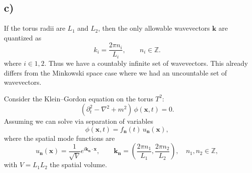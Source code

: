 \documentclass[12pt]{article}
\begin{document}
\subsection*{c)}
If the torus radii are $L_1$ and $L_2$, then the only allowable wavevectors 
$\mathbf{k}$ are quantized as
\begin{equation}
   k_i = \frac{2\pi n_i}{L_i}, \qquad n_i \in \mathbb{Z}.
\end{equation}
where $i \in {1, 2}$. Thus we have a countably infinite set of wavevectors.
This already differs from the Minkowski space case where we had an uncountable
set of wavevectors. 

Consider the Klein--Gordon equation on the torus $T^2$:
\begin{equation}
    (\partial_t^2 - \nabla^2 + m^2)\,\phi(\mathbf{x},t) = 0.
\end{equation}
Assuming we can solve via separation of variables
\begin{equation}
    \phi(\mathbf{x},t) = f_{\mathbf{n}}(t)\,u_{\mathbf{n}}(\mathbf{x}),
\end{equation}
where the spatial mode functions are
\begin{equation}
    u_{\mathbf{n}}(\mathbf{x})
    = \frac{1}{\sqrt{V}} e^{i \mathbf{k}_{\mathbf{n}} \cdot \mathbf{x}},
    \qquad
    \mathbf{k}_{\mathbf{n}}
    = \left( \frac{2\pi n_1}{L_1}, \frac{2\pi n_2}{L_2} \right),
    \quad n_1,n_2 \in \mathbb{Z},
\end{equation}
with $V=L_1L_2$ the spatial volume.
\end{document}
